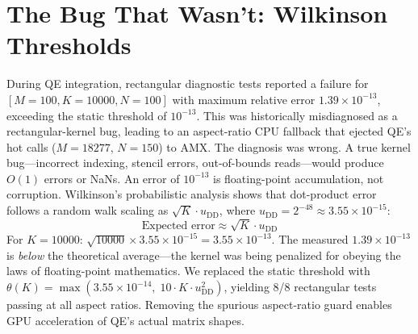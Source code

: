 \documentclass[conference]{IEEEtran}
\newcommand{\dd}{\mathrm{DD}}
\begin{document}
\section{The Bug That Wasn't: Wilkinson Thresholds}
\label{sec:wilkinson}
During QE integration, rectangular diagnostic tests reported a failure for $[M{=}100, K{=}10000, N{=}100]$ with maximum relative error $1.39 \times 10^{-13}$, exceeding the static threshold of $10^{-13}$. This was historically misdiagnosed as a rectangular-kernel bug, leading to an aspect-ratio CPU fallback that ejected QE's hot calls ($M{=}18277$, $N{=}150$) to AMX.
The diagnosis was wrong. A true kernel bug---incorrect indexing, stencil errors, out-of-bounds reads---would produce $O(1)$ errors or NaNs. An error of $10^{-13}$ is floating-point accumulation, not corruption.
Wilkinson's probabilistic analysis shows that dot-product error follows a random walk scaling as $\sqrt{K} \cdot u_{\dd}$, where $u_{\dd} = 2^{-48} \approx 3.55 \times 10^{-15}$:
\begin{equation}
\text{Expected error} \approx \sqrt{K} \cdot u_{\dd}
\end{equation}
For $K{=}10000$: $\sqrt{10000} \times 3.55 \times 10^{-15} = 3.55 \times 10^{-13}$. The measured $1.39 \times 10^{-13}$ is \emph{below} the theoretical average---the kernel was being penalized for obeying the laws of floating-point mathematics.
We replaced the static threshold with $\theta(K) = \max(3.55 \times 10^{-14},\; 10 \cdot K \cdot u_{\dd}^2)$, yielding 8/8 rectangular tests passing at all aspect ratios. Removing the spurious aspect-ratio guard enables GPU acceleration of QE's actual matrix shapes.
\end{document}
